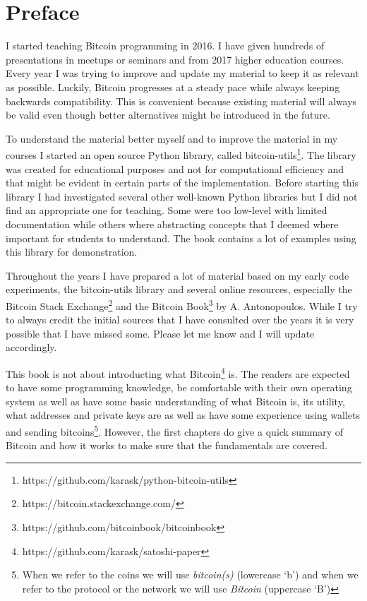 
\section{Preface}
I started teaching Bitcoin programming in 2016. I have given hundreds of presentations in meetups or seminars and from 2017 higher education courses. Every year I was trying to improve and update my material to keep it as relevant as possible. Luckily, Bitcoin progresses at a steady pace while always keeping backwards compatibility. This is convenient because existing material will always be valid even though better alternatives might be introduced in the future.

To understand the material better myself and to improve the material in my courses I started an open source Python library, called bitcoin-utils\footnote{https://github.com/karask/python-bitcoin-utils}. The library was created for educational purposes and not for computational efficiency and that might be evident in certain parts of the implementation. Before starting this library I had investigated several other well-known Python libraries but I did not find an appropriate one for teaching. Some were too low-level with limited documentation while others where abstracting concepts that I deemed where important for students to understand. The book contains a lot of examples using this library for demonstration.

Throughout the years I have prepared a lot of material based on my early code experiments, the bitcoin-utils library and several online resources, especially the Bitcoin Stack Exchange\footnote{https://bitcoin.stackexchange.com/} and the Bitcoin Book\footnote{https://github.com/bitcoinbook/bitcoinbook} by A. Antonopoulos. While I try to always credit the initial sources that I have consulted over the years it is very possible that I have missed some. Please let me know and I will update accordingly.

This book is not about introducting what Bitcoin\footnote{https://github.com/karask/satoshi-paper} is. The readers are expected to have some programming knowledge, be comfortable with their own operating system as well as have some basic understanding of what Bitcoin is, its utility, what addresses and private keys are as well as have some experience using wallets and sending bitcoins\footnote{When we refer to the coins we will use \emph{bitcoin(s)} (lowercase `b') and when we refer to the protocol or the network we will use \emph{Bitcoin} (uppercase `B')}. However, the first chapters do give a quick summary of Bitcoin and how it works to make sure that the fundamentals are covered.

